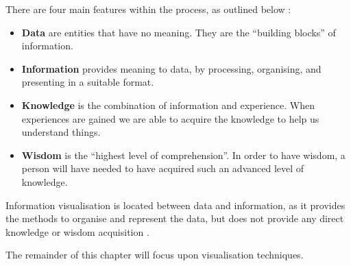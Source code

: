 There are four main features within the process, as outlined below 
\citep{riccardo09}:
\begin{itemize}
  \item {\bf Data} are entities that have no meaning. They are the ``building 
        blocks'' of information.
  \item {\bf Information} provides meaning to data, by processing, organising, 
        and presenting in a suitable format.
  \item {\bf Knowledge} is the combination of information and experience. When 
        experiences are gained we are able to acquire the knowledge to help us 
        understand things.
  \item {\bf Wisdom} is the ``highest level of comprehension''. In order to 
        have wisdom, a person will have needed to have acquired such an 
        advanced level of knowledge.
\end{itemize}

Information visualisation is located between data and information, as it 
provides the methods to organise and represent the data, but does not provide 
any direct knowledge or wisdom acquisition \citep{riccardo09}. 

The remainder of this chapter will focus upon visualisation techniques.



